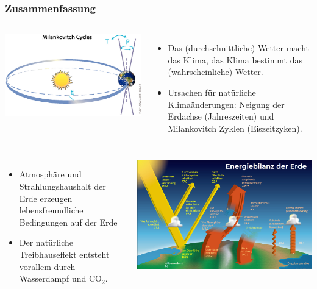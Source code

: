 \begin{frame}
	\frametitle{Zusammenfassung}
	\begin{columns}
			\includegraphics[width=0.9\linewidth]{bilder/milankovitch_IPCC2007_AR4.png}
			\begin{itemize}
				\item Das (durchschnittliche) Wetter macht das Klima, das Klima bestimmt das (wahrscheinliche) Wetter.
				\item Ursachen für natürliche Klimaänderungen: Neigung der Erdachse (Jahreszeiten) und Milankovitch Zyklen (Eiszeitzyken).
			\end{itemize}
	\end{columns}
	\begin{columns}
		\column{0.7\linewidth}
			\begin{itemize}
				\item Atmosphäre und Strahlungshaushalt der Erde erzeugen lebensfreundliche Bedingungen auf der Erde
				\item Der natürliche Treibhauseffekt entsteht vorallem durch Wasserdampf und CO$_2$.
			\end{itemize}
		\column{0.3\linewidth}
			\includegraphics[width=0.9\linewidth]{bilder/Energiebilanz_der_Erde_NASA.png}

\end{columns}
\end{frame}
